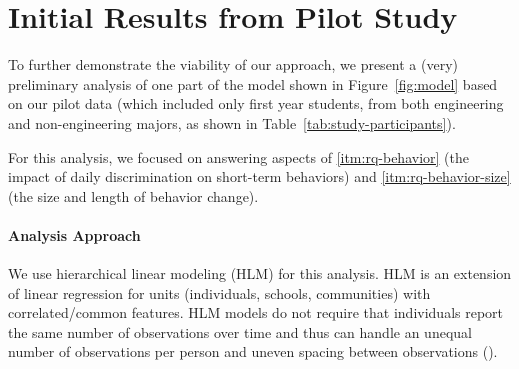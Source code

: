 \section{Initial Results from Pilot Study}
\label{sec:result}

To further demonstrate the viability of our approach, we present a (very) preliminary analysis of one part of the model shown in Figure~\ref{fig:model} based on our pilot data (which included only first year students, from both engineering and non-engineering majors, as shown in Table~\ref{tab:study-participants}). 

\noindent For this analysis, we focused on answering aspects of \ref{itm:rq-behavior} (the impact of daily discrimination on short-term behaviors) and \ref{itm:rq-behavior-size} (the size and length of behavior change). 

\paragraph{Analysis Approach}
We use hierarchical linear modeling (HLM) for this analysis. HLM is an extension of linear regression for units (\eg individuals, schools, communities) with correlated/common features. %
HLM models do not require that individuals report the same number of observations over time and thus can handle an unequal number of observations per person and uneven spacing between observations (\cite{maas2005sufficient}).

